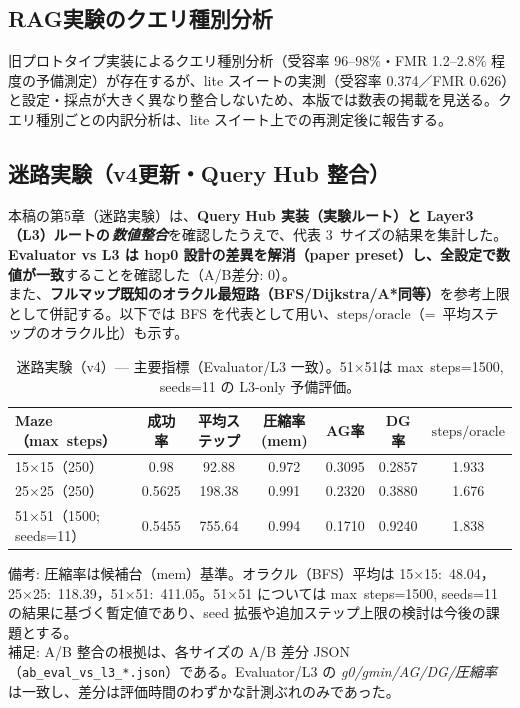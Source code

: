 \documentclass[ja=standard,xelatex]{bxjsarticle}
\begin{document}
\subsection{RAG実験のクエリ種別分析}

旧プロトタイプ実装によるクエリ種別分析（受容率 96--98\%・FMR 1.2--2.8\% 程度の予備測定）が存在するが、lite スイートの実測（受容率 0.374／FMR 0.626）と設定・採点が大きく異なり整合しないため、本版では数表の掲載を見送る。クエリ種別ごとの内訳分析は、lite スイート上での再測定後に報告する。

\subsection{迷路実験（v4更新・Query\,\textendash\,Hub 整合）}\label{sec:maze_v4_update}
\noindent 本稿の第5章（迷路実験）は、\textbf{Query\,\textendash\,Hub 実装（実験ルート）と Layer3（L3）ルートの\,\emph{数値整合}}を確認したうえで、代表 3~サイズの結果を集計した。\textbf{Evaluator vs L3 は hop0 設計の差異を解消（paper preset）し、全設定で数値が一致}することを確認した（A/B差分: 0）。\\
\noindent また、\textbf{フルマップ既知のオラクル最短路（BFS/Dijkstra/A*同等）}を参考上限として併記する。以下では BFS を代表として用い、$\mathrm{steps}/\mathrm{oracle}$（=~平均ステップのオラクル比）も示す。

  \begin{table}[H]
  \centering
  \caption{迷路実験（v4）— 主要指標（Evaluator/L3 一致）。51×51は max~steps=1500, seeds=11 の L3-only 予備評価。}
  \label{tab:maze_v4_main}
  \small
  \begin{tabular}{lcccccc}
    \toprule
    Maze（max~steps） & 成功率 & 平均ステップ & 圧縮率(mem) & AG率 & DG率 & $\mathrm{steps}/\mathrm{oracle}$ \\
    \midrule
    15$\times$15（250） & 0.98 & 92.88 & 0.972 & 0.3095 & 0.2857 & 1.933 \\
    25$\times$25（250） & 0.5625 & 198.38 & 0.991 & 0.2320 & 0.3880 & 1.676 \\
    51$\times$51（1500; seeds=11） & 0.5455 & 755.64 & 0.994 & 0.1710 & 0.9240 & 1.838 \\
    \bottomrule
  \end{tabular}
  \end{table}
  
  \noindent 備考: 圧縮率は候補台（mem）基準。オラクル（BFS）平均は 15×15:~48.04，25×25:~118.39，51×51:~411.05。51×51 については max~steps=1500, seeds=11 の結果に基づく暫定値であり、seed 拡張や追加ステップ上限の検討は今後の課題とする。\\
\noindent 補足: A/B 整合の根拠は、各サイズの A/B 差分 JSON（\texttt{ab\_eval\_vs\_l3\_*.json}）である。Evaluator/L3 の \emph{g0/gmin/AG/DG/圧縮率} は一致し、差分は評価時間のわずかな計測ぶれのみであった。
\end{document}
